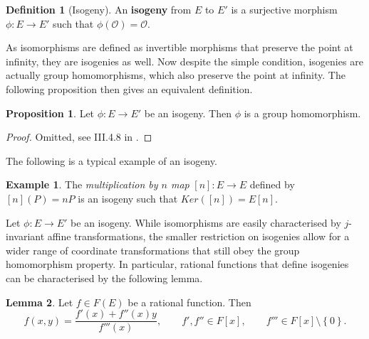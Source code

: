 \documentclass{article}
\newcommand{\rb}[1]{\left( #1 \right)}
\renewcommand{\sb}[1]{\left[ #1 \right]}
\newcommand{\cb}[1]{\left\{ #1 \right\}}
\theoremstyle{definition}
\newtheorem*{definition}{Definition}
\newtheorem*{example}{Example}
\newtheorem{proposition}{Proposition}[subsection]
\newtheorem{lemma}[proposition]{Lemma}
\begin{document}
\begin{definition}[Isogeny]
An \textbf{isogeny} from $ E $ to $ E' $ is a surjective morphism $ \phi : E \to E' $ such that $ \phi\rb{\mathcal{O}} = \mathcal{O} $.
\end{definition}

As isomorphisms are defined as invertible morphisms that preserve the point at infinity, they are isogenies as well. Now despite the simple condition, isogenies are actually group homomorphisms, which also preserve the point at infinity. The following proposition then gives an equivalent definition.

\begin{proposition}
Let $ \phi : E \to E' $ be an isogeny. Then $ \phi $ is a group homomorphism.
\end{proposition}

\begin{proof}
Omitted, see III.4.8 in \cite{gtm}.
\end{proof}

The following is a typical example of an isogeny.

\begin{example}
The \emph{multiplication by $ n $ map} $ \sb{n} : E \to E $ defined by $ \sb{n}\rb{P} = nP $ is an isogeny such that $ Ker\rb{\sb{n}} = E\sb{n} $.
\end{example}

Let $ \phi : E \to E' $ be an isogeny. While isomorphisms are easily characterised by $ j $-invariant affine transformations, the smaller restriction on isogenies allow for a wider range of coordinate transformations that still obey the group homomorphism property. In particular, rational functions that define isogenies can be characterised by the following lemma.

\begin{lemma}
Let $ f \in F\rb{E} $ be a rational function. Then
$$ f\rb{x, y} = \dfrac{f'\rb{x} + f''\rb{x}y}{f'''\rb{x}}, \qquad f', f'' \in F\sb{x}, \qquad f''' \in F\sb{x} \setminus \cb{0}. $$
\end{lemma}
\end{document}
